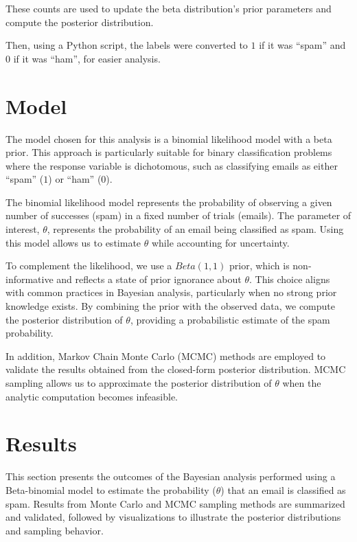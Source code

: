 \documentclass[12pt,a4paper]{article}
\begin{document}
\setcounter{table}{1}

These counts are used to update the beta distribution's prior parameters and compute the posterior
distribution.

Then, using a Python script, the labels were converted to $1$ if it was ``spam'' and $0$ if it was ``ham'',
for easier analysis.

\section{Model}\label{sec:model}
The model chosen for this analysis is a binomial likelihood model with a beta prior. This approach is
particularly suitable for binary classification problems where the response variable is dichotomous,
such as classifying emails as either ``spam'' ($1$) or ``ham'' ($0$).

The binomial likelihood model represents the probability of observing a given number of successes (spam)
in a fixed number of trials (emails). The parameter of interest, $\theta$, represents the probability of
an email being classified as spam. Using this model allows us to estimate $\theta$ while accounting for
uncertainty.

To complement the likelihood, we use a $Beta(1,1)$ prior, which is non-informative and reflects a state of
prior ignorance about $\theta$. This choice aligns with common practices in Bayesian analysis, particularly
when no strong prior knowledge exists. By combining the prior with the observed data, we compute the
posterior distribution of $\theta$, providing a probabilistic estimate of the spam probability.

In addition, Markov Chain Monte Carlo (MCMC) methods are employed to validate the results obtained from the
closed-form posterior distribution. MCMC sampling allows us to approximate the posterior distribution of 
$\theta$ when the analytic computation becomes infeasible.

\section{Results}\label{sec:results}

This section presents the outcomes of the Bayesian analysis performed using a Beta-binomial model to estimate
the probability ($\theta$) that an email is classified as spam. Results from Monte Carlo and MCMC sampling
methods are summarized and validated, followed by visualizations to illustrate the posterior distributions
and sampling behavior.
\end{document}
